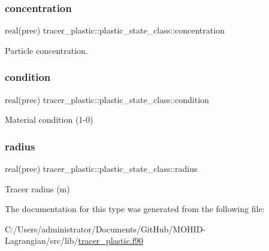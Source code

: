 \subsubsection{\texorpdfstring{concentration}{concentration}}
{\footnotesize\ttfamily real(prec) tracer\+\_\+plastic\+::plastic\+\_\+state\+\_\+class\+::concentration\hspace{0.3cm}{\ttfamily [private]}}



Particle concentration. 

\mbox{\label{structtracer__plastic_1_1plastic__state__class_a6420065359daf0885201b79212f13b5f}} 
\subsubsection{\texorpdfstring{condition}{condition}}
{\footnotesize\ttfamily real(prec) tracer\+\_\+plastic\+::plastic\+\_\+state\+\_\+class\+::condition\hspace{0.3cm}{\ttfamily [private]}}



Material condition (1-\/0) 

\mbox{\label{structtracer__plastic_1_1plastic__state__class_a88e8fcff3faa943e9134fd3b43264d38}} 
\subsubsection{\texorpdfstring{radius}{radius}}
{\footnotesize\ttfamily real(prec) tracer\+\_\+plastic\+::plastic\+\_\+state\+\_\+class\+::radius\hspace{0.3cm}{\ttfamily [private]}}



Tracer radius (m) 



The documentation for this type was generated from the following file\+:\begin{DoxyCompactItemize}
\item 
C\+:/\+Users/administrator/\+Documents/\+Git\+Hub/\+M\+O\+H\+I\+D-\/\+Lagrangian/src/lib/\hyperlink{tracer__plastic_8f90}{tracer\+\_\+plastic.\+f90}\end{DoxyCompactItemize}
